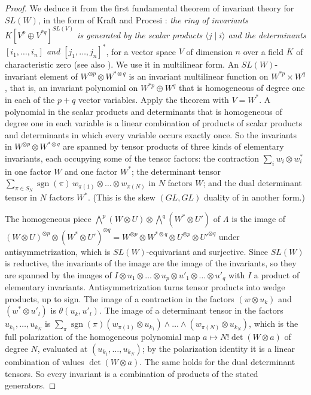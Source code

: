 \documentclass[11pt]{amsart}
\theoremstyle{definition}
\theoremstyle{remark}
\begin{document}
\begin{proof}
We deduce it from the first fundamental theorem of invariant theory for $SL(W)$, in the form of Kraft and Procesi \cite[\S8.4, Theorem (FFT for $SL_n$), p.~90]{KraftProcesi}: \emph{the ring of invariants $K[V^p\oplus V^{*q}]^{SL(V)}$ is generated by the scalar products $\langle j\mid i\rangle$ and the determinants $[i_1,\dots,i_n]$ and $[j_1,\dots,j_n]^*$}, for a vector space $V$ of dimension $n$ over a field $K$ of characteristic zero (see also \cite[Ch.~II]{Weyl}). We use it in multilinear form. An $SL(W)$-invariant element of $W^{\otimes p}\otimes W^{*\otimes q}$ is an invariant multilinear function on $W^{*p}\times W^q$, that is, an invariant polynomial on $W^{*p}\oplus W^q$ that is homogeneous of degree one in each of the $p+q$ vector variables. Apply the theorem with $V=W^*$. A polynomial in the scalar products and determinants that is homogeneous of degree one in each variable is a linear combination of products of scalar products and determinants in which every variable occurs exactly once. So the invariants in $W^{\otimes p}\otimes W^{*\otimes q}$ are spanned by tensor products of three kinds of elementary invariants, each occupying some of the tensor factors: the contraction $\sum_iw_i\otimes w_i^*$ in one factor $W$ and one factor $W^*$; the determinant tensor $\sum_{\pi\in S_N}\operatorname{sgn}(\pi)\,w_{\pi(1)}\otimes\dots\otimes w_{\pi(N)}$ in $N$ factors $W$; and the dual determinant tensor in $N$ factors $W^*$. (This is the skew $(GL,GL)$ duality of \cite{Howe} in another form.)

The homogeneous piece $\bigwedge^p(W\otimes U)\otimes\bigwedge^q(W^*\otimes U')$ of $\Lambda$ is the image of $(W\otimes U)^{\otimes p}\otimes(W^*\otimes U')^{\otimes q}=W^{\otimes p}\otimes W^{*\otimes q}\otimes U^{\otimes p}\otimes U'^{\otimes q}$ under antisymmetrization, which is $SL(W)$-equivariant and surjective. Since $SL(W)$ is reductive, the invariants of the image are the image of the invariants, so they are spanned by the images of $I\otimes u_1\otimes\dots\otimes u_p\otimes u'_1\otimes\dots\otimes u'_q$ with $I$ a product of elementary invariants. Antisymmetrization turns tensor products into wedge products, up to sign. The image of a contraction in the factors $(w\otimes u_k)$ and $(w^*\otimes u'_l)$ is $\theta(u_k,u'_l)$. The image of a determinant tensor in the factors $u_{k_1},\dots,u_{k_N}$ is $\sum_\pi\operatorname{sgn}(\pi)(w_{\pi(1)}\otimes u_{k_1})\wedge\dots\wedge(w_{\pi(N)}\otimes u_{k_N})$, which is the full polarization of the homogeneous polynomial map $a\mapsto N!\det(W\otimes a)$ of degree $N$, evaluated at $(u_{k_1},\dots,u_{k_N})$; by the polarization identity it is a linear combination of values $\det(W\otimes a)$. The same holds for the dual determinant tensors. So every invariant is a combination of products of the stated generators.
\end{proof}
\end{document}
